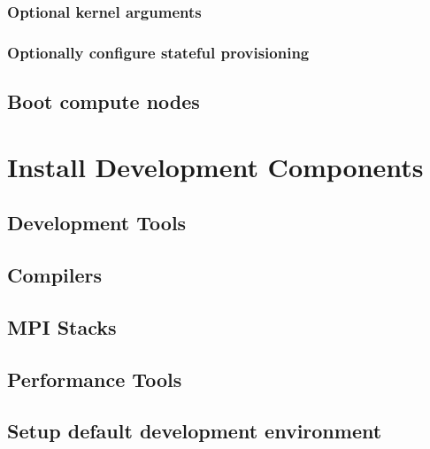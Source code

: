 \documentclass[letterpaper]{article}
\begin{document}
\subsubsection{Optional kernel arguments} \label{sec:optional_kargs}


\subsubsection{Optionally configure stateful provisioning}


\subsection{Boot compute nodes} \label{sec:boot_computes}
 

\vspace*{-0.50cm}
\section{Install \OHPC{} Development Components}


\vspace*{-0.15cm}
\subsection{Development Tools} \label{sec:install_dev_tools}


\vspace*{-0.15cm}
\subsection{Compilers} \label{sec:install_compilers}


\subsection{MPI Stacks} \label{sec:mpi}


\subsection{Performance Tools} \label{sec:install_perf_tools}


\subsection{Setup default development environment}

\end{document}

